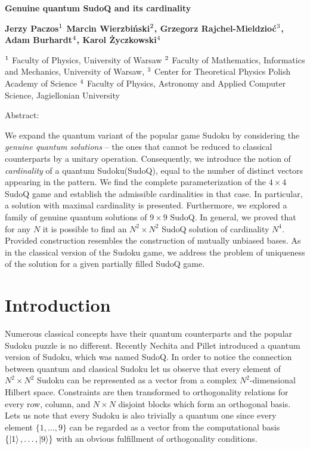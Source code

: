 \documentclass[11pt]{article}
\begin{document}
\begin{center}
{ \bf \Large 
Genuine quantum SudoQ and its cardinality
} \bigskip

{ \bf \large
	\bf{Jerzy Paczos}$^{\rm 1}$
	\bf{Marcin Wierzbiński}$^{\rm 2}$,
	\bf{Grzegorz Rajchel-Mieldzioć}$^{\rm 3}$,
	\bf{Adam Burhardt}$^{\rm 4}$,
	\bf{Karol Życzkowski}$^{\rm 4}$
} \bigskip

\begin{center}
$^{\rm 1}$ Faculty of Physics, University of Warsaw
$^{\rm 2}$ Faculty of Mathematics, Informatics and Mechanics, University of Warsaw,
$^{\rm 3}$ Center for Theoretical Physics Polish Academy of Science $^{\rm 4}$ Faculty of Physics, Astronomy and Applied Computer Science, Jagiellonian University
\end{center}
\end{center}

\bigskip

\begin{center}
    Abstract:
\end{center} 
We expand the quantum variant of the popular game Sudoku by considering the \emph{genuine quantum solutions} – the ones that cannot be reduced to classical counterparts by a unitary operation. Consequently, we introduce the notion of \emph{cardinality} of a quantum Sudoku(SudoQ), equal to the number of distinct vectors appearing in the pattern.  We find the complete parameterization of the $4\times 4$ SudoQ game and establish the admissible cardinalities in that case. In particular, a solution with maximal cardinality is presented. Furthermore, we explored a family of genuine quantum solutions of $9\times 9$ SudoQ. In general, we proved that for any $N$  it is possible to find an $N^2\times N^2$ SudoQ solution of cardinality $N^4$. Provided construction resembles the construction of mutually unbiased bases. As in the classical version of the Sudoku game, we address the problem of uniqueness of the solution for a given partially filled SudoQ game.

\section{Introduction}
Numerous classical concepts have their quantum counterparts and the popular Sudoku puzzle is no different. Recently Nechita and Pillet \cite{Nechita2020SudoQA} introduced a quantum version of Sudoku, which was named SudoQ. In order to notice the connection between quantum and classical Sudoku let us observe that every element of $N^{2}\times N^{2}$ Sudoku can be represented as a vector from a complex $N^{2}$-dimensional Hilbert space. Constraints are then transformed to orthogonality relations for every row, column, and $N \times N$ disjoint blocks which form an orthogonal basis. Lets us note that every Sudoku is also trivially a quantum one since every element $\{1, ..., 9\}$ can be regarded as a vector from the computational basis $\{ \ket{1}, \ldots , \ket{9}\}$ with an obvious fulfillment of orthogonality conditions.
\end{document}
